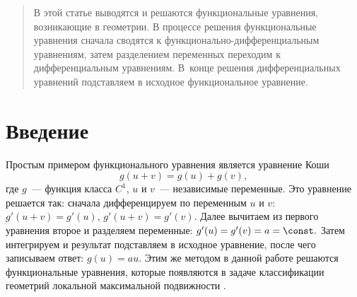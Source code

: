 %
%
%


\maketitle

\begin{abstract}
В этой статье выводятся и решаются функциональные уравнения, возникающие в геометрии. В процессе
решения функциональные уравнения сначала сводятся к функционально-дифференциальным уравнениям, затем разделением переменных переходим к дифференциальным уравнениям. В~конце решения
дифференциальных уравнений подставляем в исходное функциональное уравнение.
\end{abstract}


\section*{Введение}
Простым примером функционального уравнения является уравнение Коши
$$g(u+v) = g(u) + g(v),$$
где $g$~--- функция класса $C^1$, $u$ и $v$~--- независимые переменные. Это уравнение решается так: сначала дифференцируем по переменным $u$ и $v$: $ g'(u+v) = g'(u),\,g'(u+v) = g'(v). $
Далее вычитаем из первого уравнения второе и разделяем переменные: $ g'(u) = g'(v) = a = \const. $ Затем интегрируем и результат подставляем в исходное уравнение, после чего записываем ответ: $g(u) = au.$ Этим же методом в данной работе решаются функциональные уравнения, которые появляются в задаче классификации геометрий локальной максимальной подвижности \cite{kyrov1, kyrov2, kyrov3}.

